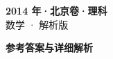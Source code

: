 \documentclass[zihao=-4, a4paper]{ctexart}
\begin{document}
\begin{center}
  {\Large\bfseries 2014 年·北京卷·理科}\\[4pt]
  {\large 数学 · 解析版}
\end{center}
\medskip
{}

\clearpage
{}
\begin{center}{\Large\bfseries 参考答案与详细解析}\end{center}
\medskip

\end{document}
